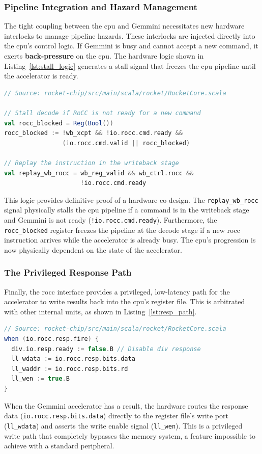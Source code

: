 \subsubsection{Pipeline Integration and Hazard Management}
The tight coupling between the \acrshort{cpu} and Gemmini necessitates new hardware interlocks to manage pipeline hazards. These interlocks are injected directly into the \acrshort{cpu}'s control logic. If Gemmini is busy and cannot accept a new command, it exerts \textbf{back-pressure} on the \acrshort{cpu}. The hardware logic shown in Listing~\ref{lst:stall_logic} generates a stall signal that freezes the \acrshort{cpu} pipeline until the accelerator is ready.

\begin{lstlisting}[language=scala, caption={RoCC-specific stall logic in the Rocket Core.}, label={lst:stall_logic}, captionpos=b]
// Source: rocket-chip/src/main/scala/rocket/RocketCore.scala

// Stall decode if RoCC is not ready for a new command
val rocc_blocked = Reg(Bool())
rocc_blocked := !wb_xcpt && !io.rocc.cmd.ready && 
                (io.rocc.cmd.valid || rocc_blocked)

// Replay the instruction in the writeback stage
val replay_wb_rocc = wb_reg_valid && wb_ctrl.rocc && 
                     !io.rocc.cmd.ready
\end{lstlisting}
This logic provides definitive proof of a hardware co-design. The \texttt{replay\_wb\_rocc} signal physically stalls the \acrshort{cpu} pipeline if a command is in the writeback stage and Gemmini is not ready (\texttt{!io.rocc.cmd.ready}). Furthermore, the \texttt{rocc\_blocked} register freezes the pipeline at the decode stage if a new \acrshort{rocc} instruction arrives while the accelerator is already busy. The \acrshort{cpu}'s progression is now physically dependent on the state of the accelerator.

\subsubsection{The Privileged Response Path}
Finally, the \acrshort{rocc} interface provides a privileged, low-latency path for the accelerator to write results back into the \acrshort{cpu}'s register file. This is arbitrated with other internal units, as shown in Listing~\ref{lst:resp_path}.

\begin{lstlisting}[language=scala, caption={RoCC response handling in the Rocket Core.}, label={lst:resp_path}, captionpos=b]
// Source: rocket-chip/src/main/scala/rocket/RocketCore.scala
when (io.rocc.resp.fire) {
  div.io.resp.ready := false.B // Disable div response
  ll_wdata := io.rocc.resp.bits.data
  ll_waddr := io.rocc.resp.bits.rd
  ll_wen := true.B
}
\end{lstlisting}
When the Gemmini accelerator has a result, the hardware routes the response data (\texttt{io.rocc.resp.bits.data}) directly to the register file's write port (\texttt{ll\_wdata}) and asserts the write enable signal (\texttt{ll\_wen}). This is a privileged write path that completely bypasses the memory system, a feature impossible to achieve with a standard peripheral.

